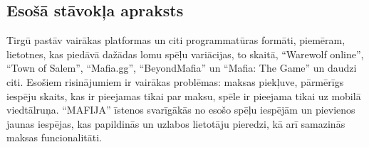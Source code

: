 \subsection{Esošā stāvokļa apraksts}
Tirgū pastāv vairākas platformas un citi programmatūras formāti, piemēram, lietotnes, kas piedāvā dažādas lomu spēļu variācijas, to skaitā, ``Warewolf online'', ``Town of Salem'', ``Mafia.gg'', ``BeyondMafia'' un ``Mafia: The Game'' un daudzi citi.
Esošiem risinājumiem ir vairākas problēmas: maksas piekļuve, pārmērīgs iespēju skaits, kas ir pieejamas tikai par maksu, spēle ir pieejama tikai uz mobilā viedtālruņa.
``MAFIJA'' īstenos svarīgākās no esošo spēļu iespējām un pievienos jaunas iespējas, kas papildinās un uzlabos lietotāju pieredzi, kā arī samazinās maksas funcionalitāti.
